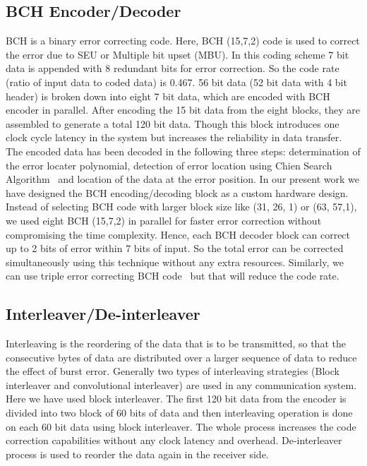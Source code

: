 \documentclass[10pt, conference, compsocconf]{IEEEtran}
\begin{document}
\subsection{BCH Encoder/Decoder} BCH is a binary error correcting code. Here, BCH (15,7,2) code is used to correct the error due to SEU or Multiple bit upset (MBU). In this coding scheme 7 bit data is appended with 8 redundant bits for error correction. So the code rate (ratio of input data to coded data) is 0.467. 56 bit data (52 bit data with 4 bit header) is broken down into eight 7 bit data, which are encoded with BCH encoder in parallel. After encoding the 15 bit data from the eight blocks, they are assembled to generate a total 120 bit data. Though this block introduces one clock cycle latency in the system but increases the reliability in data transfer. The encoded data has been decoded in the following three steps: determination of the error locater polynomial, detection of error location using Chien Search Algorithm~\cite{chien:search} and location of the data at the error position\iffalse One can find the details of BCH algorithm in~\cite{bch:book} \fi. In our present work we have designed the BCH encoding/decoding block as a custom hardware design. Instead of selecting BCH code with larger block size like (31, 26, 1) or (63, 57,1), we used eight BCH (15,7,2) in parallel for faster error correction without compromising the time complexity. Hence, each BCH decoder block can correct up to 2 bits of error within 7 bits of input. So the total    error can be corrected simultaneously using this technique without any extra resources. Similarly, we can use triple error correcting BCH code~\cite{chien:search} but that will reduce the code rate.
\subsection{Interleaver/De-interleaver} Interleaving is the reordering of the data that is to be transmitted, so that the consecutive bytes of data are distributed over a larger sequence of data to reduce the effect of burst error. Generally two types of interleaving strategies  (Block interleaver and convolutional interleaver) are used in any communication system. Here we have used block interleaver. The first 120 bit data from the encoder is divided into two block of 60 bits of data and then interleaving operation is done on each 60 bit data using block interleaver. The whole process increases the code correction capabilities without any clock latency and overhead. De-interleaver process is used to reorder the data again in the receiver side.
\end{document}
